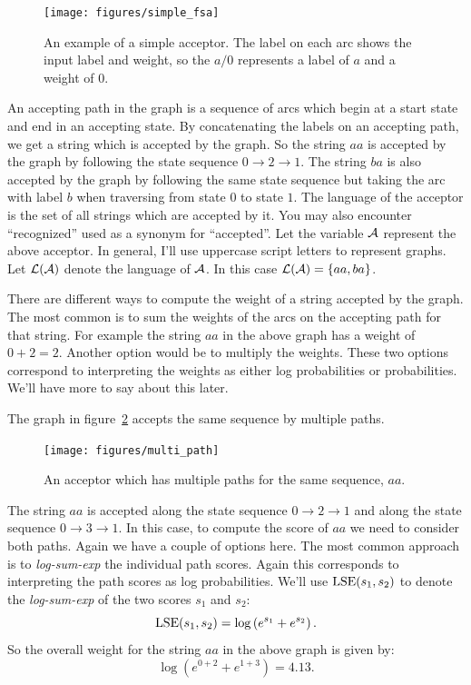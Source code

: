\begin{figure}
    \centering
    \texttt{[image: figures/simple\_fsa]}
    \caption{An example of a simple acceptor. The label on each arc shows the
    input label and weight, so the $a/0$ represents a label of $a$ and a weight
    of $0$.}
    \label{fig:simple_fsa}
\end{figure}

An accepting path in the graph is a sequence of arcs which begin at a start
state and end in an accepting state. By concatenating the labels on an
accepting path, we get a string which is accepted by the graph. So the string
$aa$ is accepted by the graph by following the state sequence $0 \rightarrow 2
\rightarrow 1$. The string $ba$ is also accepted by the graph by following the
same state sequence but taking the arc with label $b$ when traversing from
state $0$ to state $1$. The language of the acceptor is the set of all strings
which are accepted by it. You may also encounter ``recognized'' used as a
synonym for ``accepted''. Let the variable $\mathcal{A}$ represent the above acceptor.
In general, I'll use uppercase script letters to represent graphs. Let
$\mathcal{L}(\mathcal{A})$ denote the language of $\mathcal{A}$. In this case $\mathcal{L}(\mathcal{A})
= \{aa, ba\}$.

There are different ways to compute the weight of a string accepted by the
graph. The most common is to sum the weights of the arcs on the accepting path
for that string. For example the string $aa$ in the above graph has a weight of
$0 + 2 = 2$. Another option would be to multiply the weights. These two options
correspond to interpreting the weights as either log probabilities or
probabilities. We'll have more to say about this later.

The graph in figure~\ref{fig:multi_path} accepts the same sequence by multiple
paths.

\begin{figure}
    \centering
    \texttt{[image: figures/multi\_path]}
    \caption{An acceptor which has multiple paths for the same sequence, $aa$.}
    \label{fig:multi_path}
\end{figure}

The string $aa$ is accepted along the state sequence $0 \rightarrow 2
\rightarrow 1$ and along the state sequence $0 \rightarrow 3 \rightarrow 1$. In
this case, to compute the score of $aa$ we need to consider both paths. Again
we have a couple of options here. The most common approach is to
\emph{log-sum-exp} the individual path scores. Again this corresponds to
interpreting the path scores as log probabilities. We'll use $\operatorname*{\textrm{LSE}}(s_1, s_2)$
to denote the \emph{log-sum-exp} of the two scores $s_1$ and $s_2$:
\begin{equation}
\operatorname*{\textrm{LSE}}(s_1, s_2) = \log \left( e^{s_1} + e^{s_2}\right).
\end{equation}
So the overall weight for the string $aa$ in the above graph is given by:
$$
\log \left(e^{0 + 2} + e^{1 + 3}\right) = 4.13.
$$

